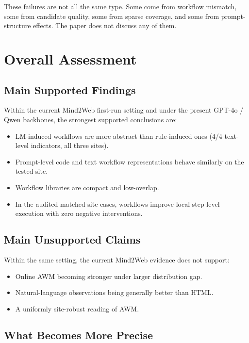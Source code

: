 \documentclass{article}
\providecommand{\tightlist}{%
  \setlength{\itemsep}{0pt}\setlength{\parskip}{0.8em}}
\begin{document}
These failures are not all the same type. Some come from workflow
mismatch, some from candidate quality, some from sparse coverage, and
some from prompt-structure effects. The paper does not discuss any of
them.

\section{Overall Assessment}\label{overall-assessment}

\subsection{Main Supported Findings}\label{what-is-reproduced}

Within the current Mind2Web first-run setting and under the present
GPT-4o / Qwen backbones, the strongest supported conclusions are:

\begin{itemize}
\tightlist
\item
  LM-induced workflows are more abstract than rule-induced ones (4/4
  text-level indicators, all three sites).
\item
  Prompt-level code and text workflow representations behave similarly
  on the tested site.
\item
  Workflow libraries are compact and low-overlap.
\item
  In the audited matched-site cases, workflows improve local
  step-level execution with zero negative interventions.
\end{itemize}

\subsection{Main Unsupported
Claims}\label{what-is-not-reproduced}

Within the same setting, the current Mind2Web evidence does not
support:

\begin{itemize}
\tightlist
\item
  Online AWM becoming stronger under larger distribution gap.
\item
  Natural-language observations being generally better than HTML.
\item
  A uniformly site-robust reading of AWM.
\end{itemize}

\subsection{What Becomes More
Precise}\label{what-becomes-more-precise}
\end{document}
